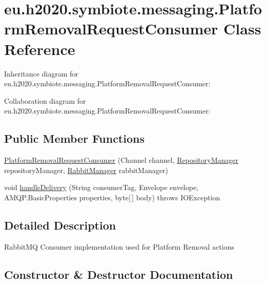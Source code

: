 \hypertarget{classeu_1_1h2020_1_1symbiote_1_1messaging_1_1PlatformRemovalRequestConsumer}{}\section{eu.\+h2020.\+symbiote.\+messaging.\+Platform\+Removal\+Request\+Consumer Class Reference}
\label{classeu_1_1h2020_1_1symbiote_1_1messaging_1_1PlatformRemovalRequestConsumer}


Inheritance diagram for eu.\+h2020.\+symbiote.\+messaging.\+Platform\+Removal\+Request\+Consumer\+:


Collaboration diagram for eu.\+h2020.\+symbiote.\+messaging.\+Platform\+Removal\+Request\+Consumer\+:
\subsection*{Public Member Functions}
\begin{DoxyCompactItemize}
\item 
\hyperlink{classeu_1_1h2020_1_1symbiote_1_1messaging_1_1PlatformRemovalRequestConsumer_a9a9727ae5b7a3ccbc533aecc82b81327}{Platform\+Removal\+Request\+Consumer} (Channel channel, \hyperlink{classeu_1_1h2020_1_1symbiote_1_1repository_1_1RepositoryManager}{Repository\+Manager} repository\+Manager, \hyperlink{classeu_1_1h2020_1_1symbiote_1_1messaging_1_1RabbitManager}{Rabbit\+Manager} rabbit\+Manager)
\item 
void \hyperlink{classeu_1_1h2020_1_1symbiote_1_1messaging_1_1PlatformRemovalRequestConsumer_a0ae1d5429dd625ccad89f8cbb219fbf8}{handle\+Delivery} (String consumer\+Tag, Envelope envelope, A\+M\+Q\+P.\+Basic\+Properties properties, byte\mbox{[}$\,$\mbox{]} body)  throws I\+O\+Exception 
\end{DoxyCompactItemize}


\subsection{Detailed Description}
Rabbit\+MQ Consumer implementation used for Platform Removal actions 

\subsection{Constructor \& Destructor Documentation}
